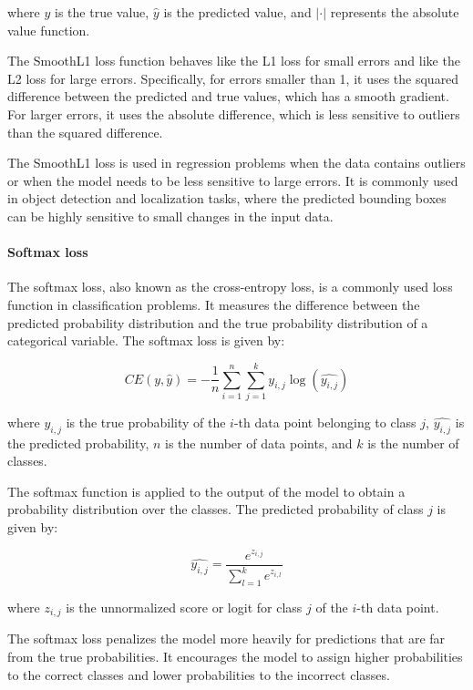 where $y$ is the true value, $\hat{y}$ is the predicted value, and $|\cdot|$ represents the absolute value function.

The SmoothL1 loss function behaves like the L1 loss for small errors and like the L2 loss for large errors. Specifically, for errors smaller than 1, it uses the squared difference between the predicted and true values, which has a smooth gradient. For larger errors, it uses the absolute difference, which is less sensitive to outliers than the squared difference.

The SmoothL1 loss is used in regression problems when the data contains outliers or when the model needs to be less sensitive to large errors. It is commonly used in object detection and localization tasks, where the predicted bounding boxes can be highly sensitive to small changes in the input data.

\paragraph{Softmax loss}
\label{par:3_softmax_loss}

The softmax loss, also known as the cross-entropy loss, is a commonly used loss function in classification problems. It measures the difference between the predicted probability distribution and the true probability distribution of a categorical variable. The softmax loss is given by:

\begin{equation}
	CE(y, \hat{y}) = -\frac{1}{n}\sum_{i=1}^{n}\sum_{j=1}^{k} y_{i,j}\log(\hat{y_{i,j}})
\end{equation}

where $y_{i,j}$ is the true probability of the $i$-th data point belonging to class $j$, $\hat{y_{i,j}}$ is the predicted probability, $n$ is the number of data points, and $k$ is the number of classes.

The softmax function is applied to the output of the model to obtain a probability distribution over the classes. The predicted probability of class $j$ is given by:

\begin{equation}
	\hat{y_{i,j}} = \frac{e^{z_{i,j}}}{\sum_{l=1}^{k} e^{z_{i,l}}}
\end{equation}

where $z_{i,j}$ is the unnormalized score or logit for class $j$ of the $i$-th data point.

The softmax loss penalizes the model more heavily for predictions that are far from the true probabilities. It encourages the model to assign higher probabilities to the correct classes and lower probabilities to the incorrect classes.

